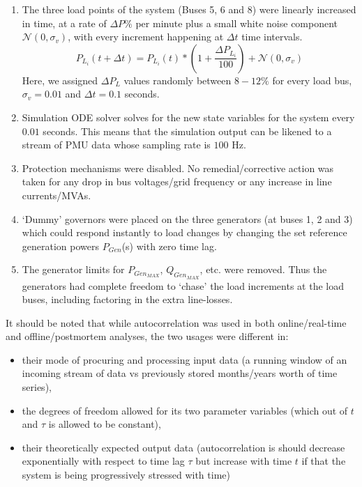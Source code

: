 \begin{enumerate}
	\item The three load points of the system (Buses 5, 6 and 8) were linearly increased in time, at a rate of $\Delta P \%$ per minute plus a small white noise component $\mathcal{N}(0, \sigma_v)$, with every increment happening at $\Delta t$ time intervals. 
	\begin{equation}
		P_{L_i}(t+\Delta t) = P_{L_i}(t)*\left(1+ \frac{\Delta P_{L_i}}{100}\right) + \mathcal{N}(0, \sigma_v)
	\end{equation} 
	Here, we assigned $\Delta P_{L}$ values randomly between $8-12\%$ for every load bus, $\sigma_v = 0.01$ and $\Delta t = 0.1$ seconds.
	\item Simulation ODE solver solves for the new state variables for the system every $0.01$ seconds. This means that the simulation output can be likened to a stream of PMU data whose sampling rate is $100$ Hz.
	\item Protection mechanisms were disabled. No remedial/corrective action was taken for any drop in bus voltages/grid frequency or any increase in line currents/MVAs.
	\item `Dummy' governors were placed on the three generators (at buses 1, 2 and 3) which could respond instantly to load changes by changing the set reference generation powers $P_{Gen}$(s) with zero time lag.
	\item The generator limits for $P_{Gen_{MAX}}$, $Q_{Gen_{MAX}}$, etc. were removed. Thus the generators had complete freedom to `chase' the load increments at the load buses, including factoring in the extra line-losses.
\end{enumerate} 

It should be noted that while autocorrelation was used in both online/real-time and offline/postmortem analyses, the two usages were different in:

\begin{itemize}
	\item their mode of procuring and processing input data (a running window of an incoming stream of data vs previously stored months/years worth of time series),
	\item the degrees of freedom allowed for its two parameter variables (which out of $t$ and $\tau$ is allowed to be constant),
	\item their theoretically expected output data (autocorrelation is should decrease exponentially with respect to time lag $\tau$ but increase with time $t$ if that the system is being progressively stressed with time)
\end{itemize} 
 